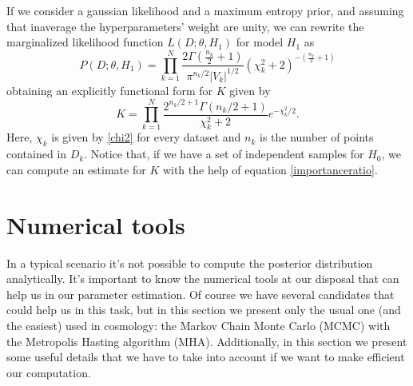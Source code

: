 \documentclass[onecolumn,           %
               showpacs,            %
               preprintnumbers,     %
               aps,                 %
               letterpaper,             %
               superscriptaddress,      %
               nofootinbib,         %
               tightenlines,        %
               floats,floatfix      %
               ,usenatbib,
               ]{revtex4-1}
\begin{document}
If we consider a gaussian likelihood and a maximum entropy prior, and assuming that  inaverage the hyperparameters' weight are unity, we can rewrite the marginalized likelihood function $L(D;\theta,H_1)$ for model $H_1$ as
\begin{equation}\label{hyperlik}
P(D;\theta,H_1)=\prod_{k=1}^N\frac{2\Gamma(\frac{n_k}{2}+1)}{\pi^{n_k/2}|V_k|^{1/2}}(\chi_k^2+2)^{-\left(\frac{n_k}{2}+1\right)}
\end{equation}
obtaining an explicitly functional form for $K$ given by
\begin{equation}\label{bayesfactork}
K=\prod_{k=1}^N\frac{2^{n_k/2+1}\Gamma(n_k/2+1)}{\chi^2_k+2}e^{-\chi_k^2/2}.
\end{equation}
Here, $\chi_k$ is given by \ref{chi2} for every dataset and $n_k$ is the number of points contained in $D_k$. Notice that, if we have a set of independent samples for $H_0$, we can compute an estimate for $K$ with the help of equation \eqref{importanceratio}. 



%

\section{Numerical tools}

In a typical scenario it's not possible to compute the posterior distribution analytically. It's important to know the numerical tools at our disposal that can help us in our parameter estimation. Of course we have several candidates that could help us in this task, but in this section we present only the usual one (and the easiest) used in cosmology: the Markov Chain Monte Carlo (MCMC) with the Metropolis Hasting algorithm (MHA). Additionally, in this section we present some useful details that we have to take into account if we want to make efficient our computation. 
\end{document}
